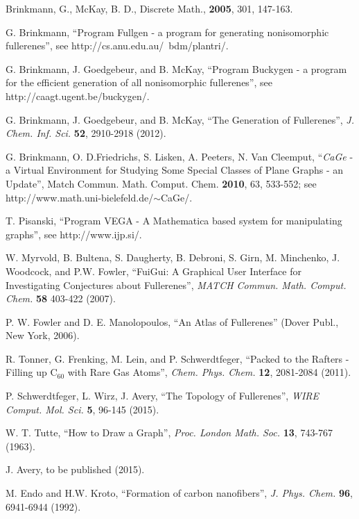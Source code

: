 \documentclass[article,a4paper,twoside]{memoir}
\newcommand{\C}[1]{\ensuremath{\mathrm{C}_{#1}}}
\newcommand{\program}[1]{\textit{#1}}
\begin{document}
\clearpage
\begin{thebibliography}{99}

 Brinkmann, G., McKay, B. D., Discrete Math., \textbf{2005}, 301, 147-163.

 G. Brinkmann, ``Program Fullgen - a program for generating nonisomorphic fullerenes'', see http://cs.anu.edu.au/~bdm/plantri/.
 
 G. Brinkmann, J. Goedgebeur, and B. McKay, ``Program Buckygen - a program for the efficient generation of all nonisomorphic fullerenes'',
see http://caagt.ugent.be/buckygen/.

 G. Brinkmann, J. Goedgebeur, and B. McKay, ``The Generation of Fullerenes'', \textit{J. Chem. Inf. Sci.} \textbf{52}, 2910-2918 (2012).

 G. Brinkmann, O. D.Friedrichs, S. Lisken, A. Peeters, N. Van Cleemput, ``\program{CaGe} - a Virtual Environment for Studying Some Special 
Classes of Plane Graphs - an Update'', Match Commun. Math. Comput. Chem. \textbf{2010}, 63, 533-552; see http://www.math.uni-bielefeld.de/$\sim$CaGe/.

 T. Pisanski, ``Program VEGA - A Mathematica based system for manipulating graphs'', see http://www.ijp.si/.

 W. Myrvold, B. Bultena, S. Daugherty, B. Debroni, S. Girn, M. Minchenko, J. Woodcock, and P.W. Fowler,
``FuiGui: A Graphical User Interface for Investigating Conjectures about Fullerenes'', \textit{MATCH Commun. Math. Comput. Chem.} \textbf{58} 403-422 (2007).

 P. W. Fowler and D. E. Manolopoulos, ``An Atlas of Fullerenes'' (Dover Publ., New York, 2006).
 
 R. Tonner, G. Frenking, M. Lein, and P. Schwerdtfeger, ``Packed to the Rafters - Filling up \C{60} with Rare Gas Atoms'', 
\textit{Chem. Phys. Chem.} \textbf{12}, 2081-2084 (2011).

 P. Schwerdtfeger, L. Wirz, J. Avery, ``The Topology of Fullerenes'', \textit{WIRE Comput. Mol. Sci.} \textbf{5}, 96-145 (2015).

 W. T. Tutte, ``How to Draw a Graph'', \textit{Proc. London Math. Soc.} \textbf{13}, 743-767 (1963).

 J. Avery, to be published (2015).

 M. Endo and H.W. Kroto, ``Formation of carbon nanofibers'', \textit{J. Phys. Chem.} \textbf{96}, 6941-6944 (1992).


\end{thebibliography}
\end{document}
